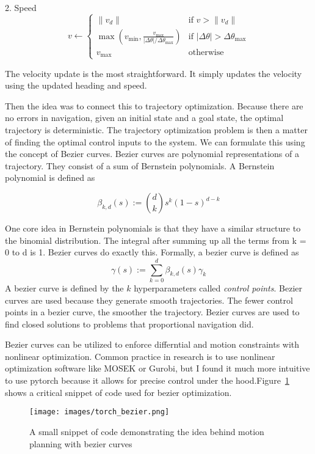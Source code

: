\documentclass[12pt]{article}
\begin{document}
2. Speed
\[
v \leftarrow 
\begin{cases} 
\|v_d\| & \text{if } v > \|v_d\| \\
\max\left(v_{\text{min}}, \frac{v_{\text{max}}}{|\Delta \theta| / \Delta \theta_{\text{max}}}\right) & \text{if } |\Delta \theta| > \Delta \theta_{\text{max}} \\
v_{\text{max}} & \text{otherwise}
\end{cases}
\]

The velocity update is the most straightforward. It simply updates the velocity using the updated heading and speed. 

Then the idea was to connect this to trajectory optimization.\cite{choiPathPlanningBased2008} Because there are no errors in navigation, given an initial state and a goal state, the optimal trajectory is deterministic. The trajectory optimization problem is then a matter of finding the optimal control inputs to the system. We can formulate this using the concept of Bezier curves. Bezier curves are polynomial representations of a trajectory. They consist of a sum of Bernstein polynomials. A Bernstein polynomial is defined as 

\[
\beta_{k,d}(s) := \binom{d}{k}s^k(1-s)^{d-k}
\]

One core idea in Bernstein polynomials is that they have a similar structure to the binomial distribution. The integral after summing up all the terms from k = 0 to d is 1. Bezier curves do exactly this. Formally, a bezier curve is defined as
\[
\gamma(s) := \sum_{k=0}^{d}\beta_{k,d}(s)\gamma_k
\]
A bezier curve is defined by the $k$ hyperparameters called \textit{control points}. Bezier curves are used because they generate smooth trajectories. The fewer control points in a bezier curve, the smoother the trajectory. Bezier curves are used to find closed solutions to problems that proportional navigation did. 

Bezier curves can be utilized to enforce differntial and motion constraints with nonlinear optimization. Common practice in research is to use nonlinear optimization software like MOSEK or Gurobi, but I found it much more intuitive to use pytorch because it allows for precise control under the hood.Figure~\ref{fig:bezier} shows a critical snippet of code used for bezier optimization. 

\begin{figure}[h] %
    \centering %
    \texttt{[image: images/torch\_bezier.png]} %
    \caption{A small snippet of code demonstrating the idea behind motion planning with bezier curves} %
    \label{fig:bezier} %
\end{figure}
\end{document}

